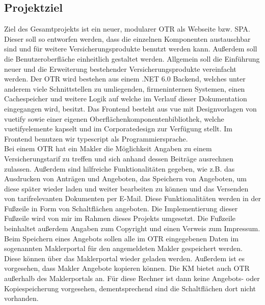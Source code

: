 \subsection{Projektziel}
\label{projektziel}
Ziel des Gesamtprojekts ist ein neuer, modularer \ac{OTR} als Webseite bzw. \ac{SPA}. Dieser soll so entworfen werden, dass die einzelnen Komponenten austauschbar sind und für weitere Versicherungsprodukte benutzt werden kann. Außerdem soll die Benutzeroberfläche einheitlich gestaltet werden. Allgemein soll die Einführung neuer und die Erweiterung bestehender Versicherungsprodukte vereinfacht werden. Der \ac{OTR} wird bestehen aus einem .NET 6.0 Backend, welches unter anderem viele Schnittstellen zu umliegenden, firmeninternen Systemen, einen Cachespeicher und weitere Logik auf welche im Verlauf dieser Dokumentation eingegangen wird, besitzt. Das Frontend besteht aus \gls{vue} mit Designvorlagen von \gls{vuetify} sowie einer eigenen Oberflächenkomponentenbibliothek, welche \gls{vuetify}elemente kapselt und im Corporatedesign zur Verfügung stellt. Im Frontend benutzen wir \gls{typescript} als Programmiersprache.
\\
Bei einem \ac{OTR} hat ein Makler die Möglichkeit Angaben zu einem Versicherungstarif zu treffen und sich anhand dessen Beiträge ausrechnen zulassen. Außerdem sind hilfreiche Funktionalitäten gegeben, wie z.B. das Ausdrucken von Anträgen und Angeboten, das Speichern von Angeboten, um diese später wieder laden und weiter bearbeiten zu können und das Versenden von tarifrelevanten Dokumenten per E-Mail. Diese Funktionalitäten werden in der Fußzeile in Form von Schaltflächen angeboten. Die Implementierung dieser Fußzeile wird von mir im Rahmen dieses Projekts umgesetzt. Die Fußzeile beinhaltet außerdem Angaben zum Copyright und einen Verweis zum Impressum.
\\

Beim Speichern eines Angebots sollen alle im \ac{OTR} eingegebenen Daten im sogenannten Maklerportal für den angemeldeten Makler gespeichert werden. Diese können über das Maklerportal wieder geladen werden. Außerdem ist es vorgesehen, dass Makler Angebote kopieren können.
Die \ac{KM} bietet auch \ac{OTR} außerhalb des Maklerportals an. Für diese Rechner ist dann keine Angebots- oder Kopiespeicherung vorgesehen, dementsprechend sind die Schaltflächen dort nicht vorhanden. \\

